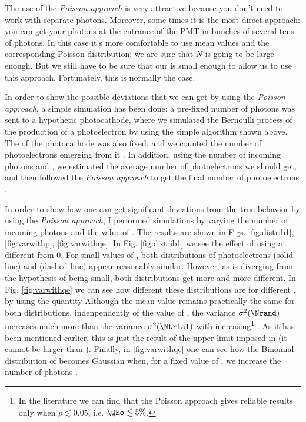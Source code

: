The use of the \emph{Poisson approach} is very attractive because you
don't need to work with separate photons. Moreover, some times it is
the most direct approach: you can get your photons at the entrance of
the PMT in bunches of several tens of photons. In this case it's more
comfortable to use mean values and the corresponding Poisson
distribution: we are sure that $N$ is going to be large enough. But we
still have to be sure that our \QEo is small enough to allow us to use
this approach. Fortunately, this is normally the case.

In order to show the possible deviations that we can get by using the
\emph{Poisson approach}, a simple simulation has been done: a
pre-fixed number of photons \Nphot was sent to a hypothetic
photocathode, where we simulated the Bernoulli process of the
production of a photoelectron by using the simple algorithm shown
above.  The \QEo of the photocathode was also fixed, and we counted
the number of photoelectrons emerging from it \Ntrial.  In addition,
using the number of incoming photons and \QEo, we estimated the
average number of photoelectrons \Nmean we should get, and then
followed the \emph{Poisson approach} to get the final number of
photoelectrons \Nrand.

In order to show how one can get significant deviations from the true
behavior by using the \emph{Poisson approach}, I performed simulations
by varying the number of incoming photons and the value of \QEo. The
results are shown in Figs. \ref{fig:distrib1}, \ref{fig:varwithp},
\ref{fig:varwithqe}. In Fig.  \ref{fig:distrib1} we see the effect of
using a \QEo different from $0$. For small values of \QEo, both
distributions of photoelectrons \Ntrial (solid line) and \Nrand
(dashed line) appear reasonably similar. However, as \QEo is diverging
from the hypothesis of \QEo being small, both distributions get more
and more different. In Fig. \ref{fig:varwithqe} we can see how
different these distributions are for different \QEo, by using the
quantity
%
\varquoteq
%
Although the mean value remains practically the same for both
distributions, indenpendently of the value of \QEo, the variance
$\sigma^2(\Nrand)$ increases much more than the variance
$\sigma^2(\Ntrial)$ with increasing\footnote{In the literature we can
  find that the Poisson approach gives reliable results only when
  $p\lesssim 0.05$, i.e. $\QEo\lesssim 5\%$.} \QEo. As it has been
mentioned earlier, this is just the result of the upper limit imposed
in \Ntrial (it cannot be larger than \Nphot). Finally, in
\ref{fig:varwithqe} one can see how the Binomial distribution of
\Ntrial becomes Gaussian when, for a fixed value of \QEo, we increase
the number of photons \Nphot.

